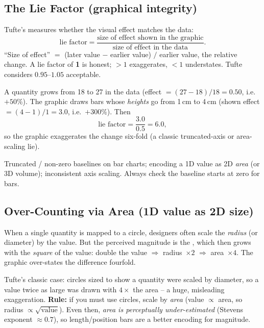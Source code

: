 \subsection{The Lie Factor (graphical integrity)}

Tufte's  measures whether the visual effect matches the data:
\[
  \text{lie factor} = \frac{\text{size of effect shown in the graphic}}
                           {\text{size of effect in the data}}.
\]
``Size of effect'' $=$ (later value $-$ earlier value) $/$ earlier value, the
relative change. A lie factor of \textbf{1} is honest; $>1$ exaggerates,
$<1$ understates. Tufte considers $0.95$--$1.05$ acceptable.

\begin{exambox}
A quantity grows from 18 to 27 in the data (effect $= (27-18)/18 = 0.50$, i.e.\
$+50\%$). The graphic draws bars whose \emph{heights} go from 1\,cm to 4\,cm
(shown effect $= (4-1)/1 = 3.0$, i.e.\ $+300\%$). Then
\[
  \text{lie factor} = \frac{3.0}{0.5} = 6.0,
\]
so the graphic exaggerates the change six-fold (a classic truncated-axis or
area-scaling lie).
\end{exambox}

\begin{pitfall}
Truncated / non-zero baselines on bar charts; encoding a 1D value as 2D
\emph{area} (or 3D volume); inconsistent axis scaling. Always check the
baseline starts at zero for bars.
\end{pitfall}

\subsection{Over-Counting via Area (1D value as 2D size)}

When a single quantity is mapped to a circle, designers often scale the
\emph{radius} (or diameter) by the value. But the perceived magnitude is the
\term{area}, which then grows with the \emph{square} of the value:
double the value $\Rightarrow$ radius~$\times2$ $\Rightarrow$
area~$\times4$. The graphic over-states the difference fourfold.

\begin{exambox}
Tufte's classic case: circles sized to show a quantity were scaled by diameter,
so a value twice as large was drawn with $4\times$ the area -- a huge,
misleading exaggeration. \textbf{Rule:} if you must use circles, scale by
\emph{area} (value $\propto$ area, so radius $\propto \sqrt{\text{value}}$).
Even then, \emph{area is perceptually under-estimated} (Stevens exponent
$\approx 0.7$), so length/position bars are a better encoding for magnitude.
\end{exambox}


